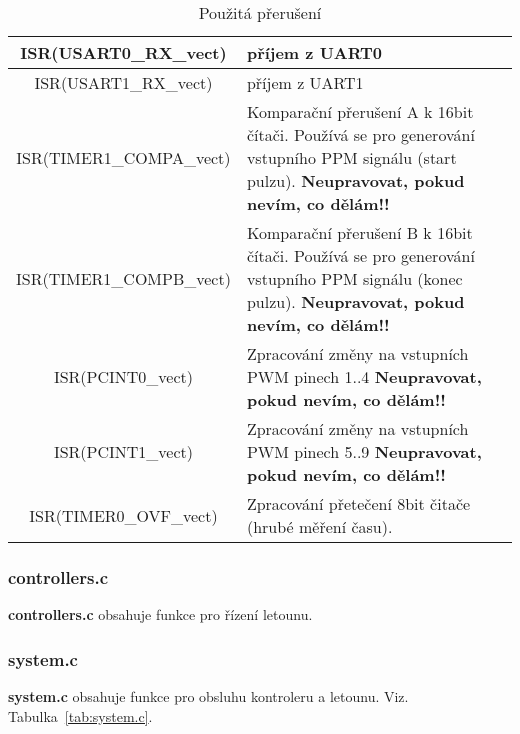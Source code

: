 \documentclass[11pt, a4paper]{article}
\begin{document}
\begin{table}
\begin{center}
\begin{tabular}{| c | p{8cm} |}
\hline
ISR(USART0\_RX\_vect) & příjem z UART0 \\
\hline
ISR(USART1\_RX\_vect) & příjem z UART1 \\
\hline
ISR(TIMER1\_COMPA\_vect) & Komparační přerušení A k 16bit čítači. Používá se pro generování vstupního PPM signálu (start pulzu).
\newline \textbf{Neupravovat, pokud nevím, co dělám!!}\\
\hline
ISR(TIMER1\_COMPB\_vect) & Komparační přerušení B k 16bit čítači. Používá se pro generování vstupního PPM signálu (konec pulzu).
\newline \textbf{Neupravovat, pokud nevím, co dělám!!}\\
\hline
ISR(PCINT0\_vect) & Zpracování změny na vstupních PWM pinech 1..4
\newline \textbf{Neupravovat, pokud nevím, co dělám!!}\\
\hline
ISR(PCINT1\_vect) & Zpracování změny na vstupních PWM pinech 5..9
\newline \textbf{Neupravovat, pokud nevím, co dělám!!}\\
\hline
ISR(TIMER0\_OVF\_vect) & Zpracování přetečení 8bit čitače (hrubé měření času). \\
\hline
\end{tabular}
\caption{Použitá přerušení}
\label{tab:interrupts}
\end{center}
\end{table}

\subsubsection{controllers.c}

\textbf{controllers.c} obsahuje funkce pro řízení letounu.

\subsubsection{system.c}

\textbf{system.c} obsahuje funkce pro obsluhu kontroleru a letounu. Viz. Tabulka~\ref{tab:system.c}.
\end{document}
